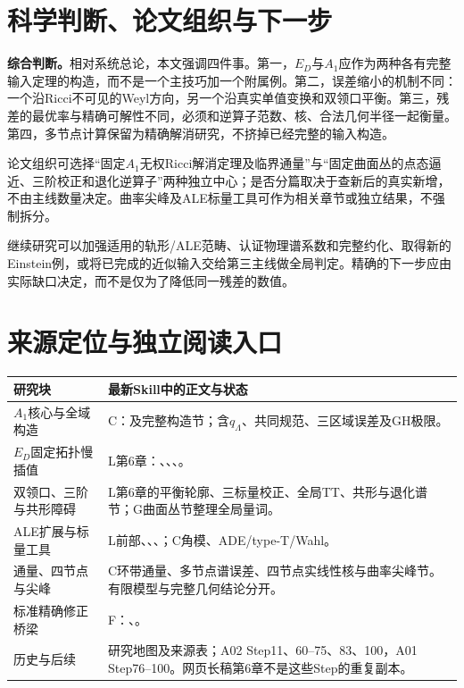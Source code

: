 \documentclass[UTF8,fontset=fandol,zihao=-4]{ctexart}
\theoremstyle{research}
\numberwithin{equation}{section}
\begin{document}
\section{科学判断、论文组织与下一步}
\textbf{综合判断。}相对系统总论，本文强调四件事。第一，$E_D$与$A_1$应作为两种各有完整输入定理的构造，而不是一个主技巧加一个附属例。第二，误差缩小的机制不同：一个沿Ricci不可见的Weyl方向，另一个沿真实单值变换和双领口平衡。第三，残差的最优率与精确可解性不同，必须和逆算子范数、核、合法几何半径一起衡量。第四，多节点计算保留为精确解消研究，不挤掉已经完整的输入构造。

论文组织可选择“固定$A_1$无权Ricci解消定理及临界通量”与“固定曲面丛的点态逼近、三阶校正和退化逆算子”两种独立中心；是否分篇取决于查新后的真实新增，不由主线数量决定。曲率尖峰及ALE标量工具可作为相关章节或独立结果，不强制拆分。

继续研究可以加强适用的轨形/ALE范畴、认证物理谱系数和完整约化、取得新的Einstein例，或将已完成的近似输入交给第三主线做全局判定。精确的下一步应由实际缺口决定，而不是仅为了降低同一残差的数值。

\section{来源定位与独立阅读入口}
\begin{longtable}{P{.29\textwidth}P{.63\textwidth}}
\toprule 研究块 & 最新Skill中的正文与状态\\\midrule\endhead
$A_1$核心与全域构造 & C：及完整构造节；含$q_\Lambda$、共同规范、三区域误差及GH极限。\\
$E_D$固定拓扑慢插值 & L第6章：、、、。\\
双领口、三阶与共形障碍 & L第6章的平衡轮廓、三标量校正、全局TT、共形与退化谱节；G曲面丛节整理全局量词。\\
ALE扩展与标量工具 & L前部、、、；C角模、ADE/type-T/Wahl。\\
通量、四节点与尖峰 & C环带通量、多节点谱误差、四节点实线性核与曲率尖峰节。有限模型与完整几何结论分开。\\
标准精确修正桥梁 & F：、。\\
历史与后续 & 研究地图及来源表；A02 Step11、60--75、83、100，A01 Step76--100。网页长稿第6章不是这些Step的重复副本。\\\bottomrule
\end{longtable}
\end{document}
